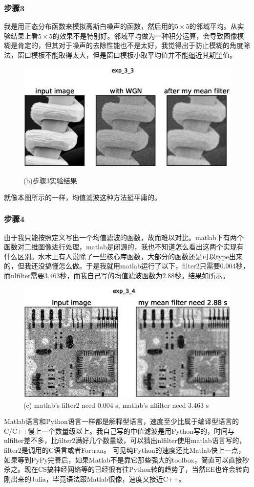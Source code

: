 \documentclass[]{IEEEphot}
\begin{document}
\subsubsection{步骤3}
我是用正态分布函数来模拟高斯白噪声的函数，然后用的$5\times5$的邻域平均。从实验结果上看$5\times5$的效果不是特别好。邻域平均做为一种积分运算，会导致图像模糊是肯定的，但其对于噪声的去除性能也不是太好，我觉得出于防止模糊的角度除法，窗口模板不能取得太大，但是窗口模板小取平均值并不能逼近其期望值。
\begin{figure}[h]
	\centering
	\includegraphics[width=30pc]{exp_3_3.eps}\\
	\caption{(b)步骤3实验结果}
\end{figure}
就像本图所示的一样，均值滤波这种方法挺平庸的。
\subsubsection{步骤4}
由于我只能按照定义写出一个均值滤波的函数，故而难以对比。matlab下有两个函数对二维图像进行处理，matlab是闭源的，我也不知道怎么看出这两个实现有什么区别。水木上有人说除了一些核心库函数，大部分的函数还是可以type出来的，但我还没搞懂怎么做。于是我就用matlab运行了以下，filter2只需要0.004秒，而nlfilter需要3.463秒，而我自己写的均值滤波函数为2.88秒。结果如所示。
\begin{figure}[h]
	\centering
	\includegraphics[width=30pc]{exp_3_4.eps}
	\caption{(c)  matlab's filter2 need 0.004 s, matlab's nlfilter need 3.463 s}
\end{figure}
Matlab语言和Python语言一样都是解释型语言，速度至少比属于编译型语言的C/C++慢上一个数量级以上。我自己写的中值滤波是用Python写的，时间与nlfilter差不多，比filter2满好几个数量级，可以猜出nlfilter使用matlab语言写的，filter2是调用的C语言或者Fortran。
可见纯Python的速度还比Matlab快上一点，如果等到PyPy完善后，如果Matlab不是靠它那些强大的toolbox，简直可以直接秒杀之。现在CS搞神经网络等的已经很有往Python转的趋势了，当然EE也许会转向刚出来的Julia，毕竟语法跟Matlab很像，速度又接近C++。
\end{document}
